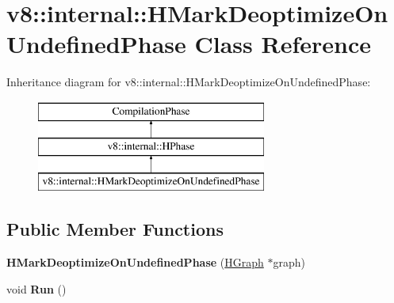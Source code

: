 \hypertarget{classv8_1_1internal_1_1_h_mark_deoptimize_on_undefined_phase}{}\section{v8\+:\+:internal\+:\+:H\+Mark\+Deoptimize\+On\+Undefined\+Phase Class Reference}
\label{classv8_1_1internal_1_1_h_mark_deoptimize_on_undefined_phase}
Inheritance diagram for v8\+:\+:internal\+:\+:H\+Mark\+Deoptimize\+On\+Undefined\+Phase\+:\begin{figure}[H]
\begin{center}
\leavevmode
\includegraphics[height=3.000000cm]{classv8_1_1internal_1_1_h_mark_deoptimize_on_undefined_phase}
\end{center}
\end{figure}
\subsection*{Public Member Functions}
\begin{DoxyCompactItemize}
\item 
{\bfseries H\+Mark\+Deoptimize\+On\+Undefined\+Phase} (\hyperlink{classv8_1_1internal_1_1_h_graph}{H\+Graph} $\ast$graph)\hypertarget{classv8_1_1internal_1_1_h_mark_deoptimize_on_undefined_phase_a263830b1533263b51a21c97ac76d9e53}{}\label{classv8_1_1internal_1_1_h_mark_deoptimize_on_undefined_phase_a263830b1533263b51a21c97ac76d9e53}

\item 
void {\bfseries Run} ()\hypertarget{classv8_1_1internal_1_1_h_mark_deoptimize_on_undefined_phase_a236682051cc067b39a8bb7642a80bc11}{}\label{classv8_1_1internal_1_1_h_mark_deoptimize_on_undefined_phase_a236682051cc067b39a8bb7642a80bc11}

\end{DoxyCompactItemize}
